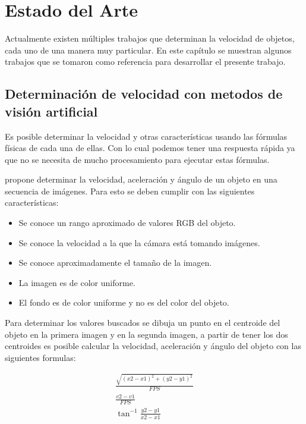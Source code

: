 \chapter{Estado del Arte}

Actualmente existen múltiples trabajos que determinan la velocidad de objetos, cada uno de una manera muy particular. En este capítulo se muestran algunos trabajos que se tomaron como referencia para desarrollar el presente trabajo.

\section{Determinación de velocidad con metodos de visión artificial}

Es posible determinar la velocidad y otras características usando las fórmulas físicas de cada una de ellas. Con lo cual podemos tener una respuesta rápida ya que no se necesita de mucho procesamiento para ejecutar estas fórmulas.

\citeauthor{singh2007Estimating} propone determinar la velocidad, aceleración y ángulo de un objeto en  una secuencia de imágenes. Para esto se deben cumplir con las siguientes características:

\begin{itemize}
\item Se conoce un rango aproximado de valores RGB del objeto.
\item Se conoce la velocidad a la que la cámara está tomando imágenes.
\item Se conoce aproximadamente el tamaño de la imagen.
\item La imagen es de color uniforme.
\item El fondo es de color uniforme y no es del color del objeto.
\end{itemize}

Para determinar los valores buscados se dibuja un punto en el centroide del objeto en la primera imagen y en la segunda imagen, a partir de tener los dos centroides es posible calcular la velocidad, aceleración y ángulo del objeto con las siguientes formulas:

\begin{eqnarray}
    \frac{
        \sqrt{
            (x2-x1)^{2} + (y2-y1)^{2}
        }
    }{
        FPS
    }\\
    \frac{
        v2-v1
    }{
        FPS
    }\\
    \tan^{-1}\frac{y2-y1}{x2-x1}
\end{eqnarray}


